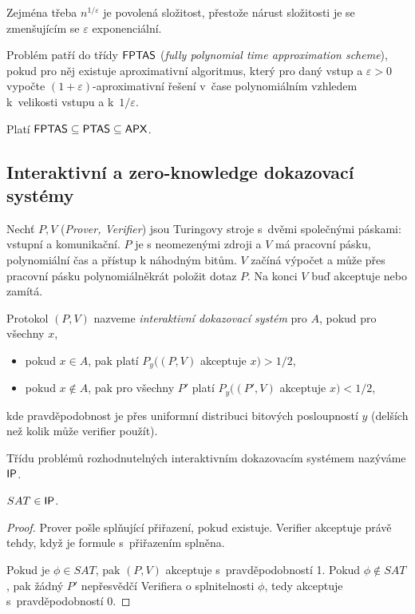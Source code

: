 Zejména třeba $n^{1/\varepsilon}$ je povolená
složitost, přestože nárust složitosti je se zmenšujícím se $\varepsilon$
exponenciální.

\begin{definition}
    Problém patří do třídy ${\mathsf{FPTAS}}$ ({\em fully polynomial time approximation
    scheme}), pokud pro něj existuje
    aproximativní algoritmus, který pro daný vstup a $\varepsilon > 0$
    vypočte $(1+\varepsilon)$-aproximativní řešení
    v~čase polynomiálním vzhledem k~velikosti vstupu a k~$1/\varepsilon$.
\end{definition}

Platí ${\mathsf{FPTAS}} \subseteq {\ensuremath{\mathsf{PTAS}}} \subseteq {\ensuremath{\mathsf{APX}}}$.

\subsection{Interaktivní a zero-knowledge dokazovací systémy}

\begin{definition}
    Nechť $P, V$ ({\em Prover, Verifier}) jsou Turingovy stroje s~dvěmi
    společnými páskami: vstupní a komunikační. $P$ je s neomezenými
    zdroji a $V$ má pracovní pásku, polynomiální čas a přístup k
    náhodným bitům. $V$ začíná výpočet a může přes pracovní pásku
    polynomiálněkrát položit dotaz $P$. Na konci $V$ buď akceptuje
    nebo zamítá.

    Protokol $(P,V)$ nazveme {\em interaktivní dokazovací systém} pro
    $A$, pokud pro všechny $x$,
    \begin{itemize}
        \item pokud $x \in A$, pak platí $P_y((P,V)$ akceptuje $x) > 1/2$,
        \item pokud $x \not \in A$, pak pro všechny $P'$ platí $P_y((P',V)$
            akceptuje $x) < 1/2$,
    \end{itemize}
    kde pravděpodobnost je přes uniformní distribuci bitových
    posloupností $y$ (delších než kolik může verifier použít).

    Třídu problémů rozhodnutelných interaktivním dokazovacím systémem nazýváme
    ${\mathsf{IP}}$.
\end{definition}

\pagebreak

\begin{theorem}
    $SAT \in {\ensuremath{\mathsf{IP}}}$.
\end{theorem}

\begin{proof}
    Prover pošle splňující přiřazení, pokud existuje. Verifier
    akceptuje právě tehdy, když je formule s~přiřazením splněna.

    Pokud je $\phi \in SAT$, pak $(P,V)$ akceptuje s~pravděpodobností 1.
    Pokud $\phi \not \in SAT$, pak žádný $P'$ nepřesvědčí Verifiera o
    splnitelnosti $\phi$, tedy akceptuje s~pravděpodobností 0.
\end{proof}

